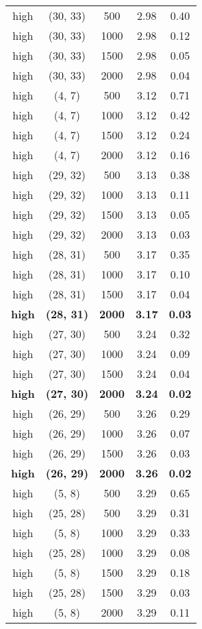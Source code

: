 \begin{tabular}{c c c c c}
high & (30, 33) &  500 & 2.98 & 0.40 \\
high & (30, 33) &  1000 & 2.98 & 0.12 \\
high & (30, 33) &  1500 & 2.98 & 0.05 \\
high & (30, 33) &  2000 & 2.98 & 0.04 \\
high & (4, 7) &  500 & 3.12 & 0.71 \\
high & (4, 7) &  1000 & 3.12 & 0.42 \\
high & (4, 7) &  1500 & 3.12 & 0.24 \\
high & (4, 7) &  2000 & 3.12 & 0.16 \\
high & (29, 32) &  500 & 3.13 & 0.38 \\
high & (29, 32) &  1000 & 3.13 & 0.11 \\
high & (29, 32) &  1500 & 3.13 & 0.05 \\
high & (29, 32) &  2000 & 3.13 & 0.03 \\
high & (28, 31) &  500 & 3.17 & 0.35 \\
high & (28, 31) &  1000 & 3.17 & 0.10 \\
high & (28, 31) &  1500 & 3.17 & 0.04 \\
\textbf{high} & \textbf{(28, 31)} & \textbf{ 2000} & \textbf{3.17} & \textbf{0.03} \\
high & (27, 30) &  500 & 3.24 & 0.32 \\
high & (27, 30) &  1000 & 3.24 & 0.09 \\
high & (27, 30) &  1500 & 3.24 & 0.04 \\
\textbf{high} & \textbf{(27, 30)} & \textbf{ 2000} & \textbf{3.24} & \textbf{0.02} \\
high & (26, 29) &  500 & 3.26 & 0.29 \\
high & (26, 29) &  1000 & 3.26 & 0.07 \\
high & (26, 29) &  1500 & 3.26 & 0.03 \\
\textbf{high} & \textbf{(26, 29)} & \textbf{ 2000} & \textbf{3.26} & \textbf{0.02} \\
high & (5, 8) &  500 & 3.29 & 0.65 \\
high & (25, 28) &  500 & 3.29 & 0.31 \\
high & (5, 8) &  1000 & 3.29 & 0.33 \\
high & (25, 28) &  1000 & 3.29 & 0.08 \\
high & (5, 8) &  1500 & 3.29 & 0.18 \\
high & (25, 28) &  1500 & 3.29 & 0.03 \\
high & (5, 8) &  2000 & 3.29 & 0.11 \\

\end{tabular}
